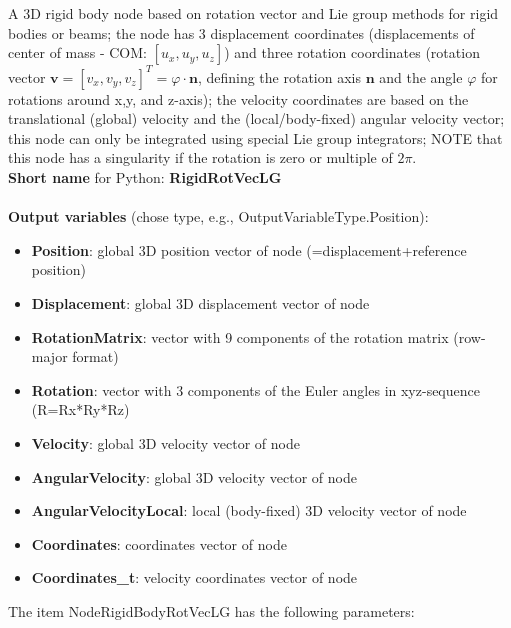A 3D rigid body node based on rotation vector and Lie group methods for rigid bodies or beams; the node has 3 displacement coordinates (displacements of center of mass - COM: $[u_x,u_y,u_z]$) and three rotation coordinates (rotation vector $\mathbf{v} = [v_x,v_y,v_z]^T = \varphi \cdot \mathbf{n}$, defining the rotation axis $\mathbf{n}$ and the angle $\varphi$ for rotations around x,y, and z-axis); the velocity coordinates are based on the translational (global) velocity and the (local/body-fixed) angular velocity vector; this node can only be integrated using special Lie group integrators; NOTE that this node has a singularity if the rotation is zero or multiple of $2\pi$.
 \\
{\bf Short name} for Python: {\bf RigidRotVecLG}
 \\\\ 
{\bf Output variables} (chose type, e.g., OutputVariableType.Position): 
\begin{itemize}
    \item {\bf Position}: global 3D position vector of node (=displacement+reference position)
    \item {\bf Displacement}: global 3D displacement vector of node
    \item {\bf RotationMatrix}: vector with 9 components of the rotation matrix (row-major format)
    \item {\bf Rotation}: vector with 3 components of the Euler angles in xyz-sequence (R=Rx*Ry*Rz)
    \item {\bf Velocity}: global 3D velocity vector of node
    \item {\bf AngularVelocity}: global 3D velocity vector of node
    \item {\bf AngularVelocityLocal}: local (body-fixed) 3D velocity vector of node
    \item {\bf Coordinates}: coordinates vector of node
    \item {\bf Coordinates\_t}: velocity coordinates vector of node
\end{itemize}
The item NodeRigidBodyRotVecLG has the following parameters:
